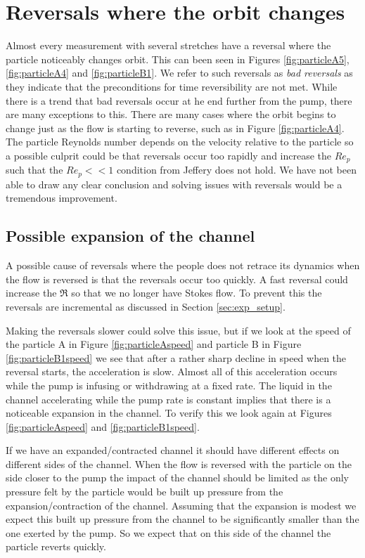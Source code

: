 \section{Reversals where the orbit changes}
Almost every measurement with several stretches have a reversal where the particle noticeably changes orbit. This can been seen in Figures \ref{fig:particleA5}, \ref{fig:particleA4} and \ref{fig:particleB1}. We refer to such reversals as \emph{bad reversals} as they indicate that the preconditions for time reversibility are not met. While there is a trend that bad reversals occur at he end further from the pump, there are many exceptions to this. There are many cases where the orbit begins to change just as the flow is starting to reverse, such as in Figure \ref{fig:particleA4}. The particle Reynolds number depends on the velocity relative to the particle so a possible culprit could be that reversals occur too rapidly and increase the $Re_p$ such that the $Re_p << 1$ condition from Jeffery \cite{Jeffery} does not hold. We have not been able to draw any clear conclusion and solving issues with reversals would be a tremendous improvement.


\subsection{Possible expansion of the channel}
A possible cause of reversals where the people does not retrace its dynamics when the flow is reversed is that the reversals occur too quickly. A fast reversal could increase the $\Re$ so that we no longer have Stokes flow. To prevent this the reversals are incremental as discussed in Section \ref{sec:exp_setup}. 

Making the reversals slower could solve this issue, but if we look at the speed of the particle A in Figure \ref{fig:particleAspeed} and particle B in Figure \ref{fig:particleB1speed} we see that after a rather 
sharp decline in speed when the reversal starts, the acceleration is slow. Almost all of this acceleration occurs while the pump is 
infusing or withdrawing at a fixed rate. The liquid in the channel accelerating while the pump rate is constant implies that there 
is a noticeable expansion in the channel. To verify this we look again at Figures
\ref{fig:particleAspeed} and \ref{fig:particleB1speed}.

If we have an expanded/contracted channel it should have different effects on different sides of the channel. When the flow is reversed with the particle on the side closer to the pump the impact of the channel should be limited as the only pressure felt by the particle would be built up pressure from the expansion/contraction of the channel. Assuming that the expansion is modest we expect this built up pressure from the channel to be significantly smaller than the one exerted by the pump. So we expect that on this side of the channel the particle reverts quickly.

